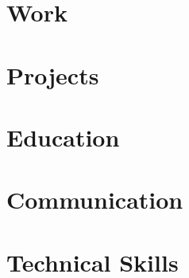 \documentclass[12pt, a4paper, sans, obeyspaces, unicode]{moderncv}
\begin{document}
\maketitle

\vspace{0.5cm}
\section{Work}

    

\section{Projects}

    


\pagebreak

\section{Education}

    

\section{Communication}

    

\section{Technical Skills}

    
\end{document}
